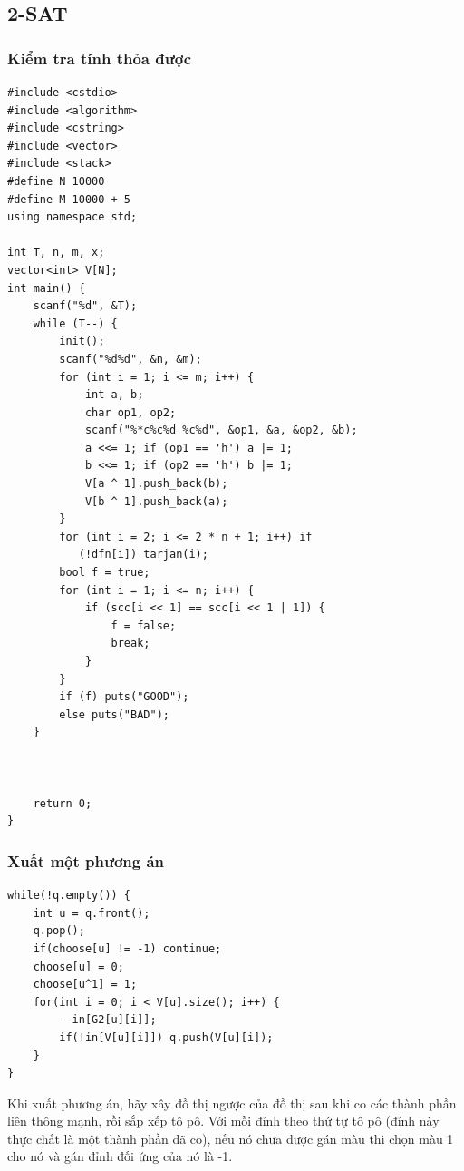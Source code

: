 \documentclass[11pt]{article}
\begin{document}
\subsection{2-SAT}

\subsubsection{Kiểm tra tính thỏa được}

\begingroup
\footnotesize
\begin{verbatim}
#include <cstdio>
#include <algorithm>
#include <cstring>
#include <vector>
#include <stack>
#define N 10000
#define M 10000 + 5
using namespace std;

int T, n, m, x;
vector<int> V[N];
int main() {
    scanf("%d", &T);
    while (T--) {
        init();
        scanf("%d%d", &n, &m);
        for (int i = 1; i <= m; i++) {
            int a, b;
            char op1, op2;
            scanf("%*c%c%d %c%d", &op1, &a, &op2, &b);
            a <<= 1; if (op1 == 'h') a |= 1;
            b <<= 1; if (op2 == 'h') b |= 1;
            V[a ^ 1].push_back(b);
            V[b ^ 1].push_back(a);
        }
        for (int i = 2; i <= 2 * n + 1; i++) if
           (!dfn[i]) tarjan(i);
        bool f = true;
        for (int i = 1; i <= n; i++) {
            if (scc[i << 1] == scc[i << 1 | 1]) {
                f = false;
                break;
            }
        }
        if (f) puts("GOOD");
        else puts("BAD");
    }



    return 0;
}
\end{verbatim}
\endgroup

\subsubsection{Xuất một phương án}

\begingroup
\footnotesize
\begin{verbatim}
while(!q.empty()) {
    int u = q.front();
    q.pop();
    if(choose[u] != -1) continue;
    choose[u] = 0;
    choose[u^1] = 1;
    for(int i = 0; i < V[u].size(); i++) {
        --in[G2[u][i]];
        if(!in[V[u][i]]) q.push(V[u][i]);
    }
}
\end{verbatim}
\endgroup

Khi xuất phương án, hãy xây đồ thị ngược của đồ thị sau khi co các thành phần liên thông mạnh, rồi sắp xếp tô pô. Với mỗi đỉnh theo thứ tự tô pô (đỉnh này thực chất là một thành phần đã co), nếu nó chưa được gán màu thì chọn màu 1 cho nó và gán đỉnh đối ứng của nó là -1.
\end{document}
